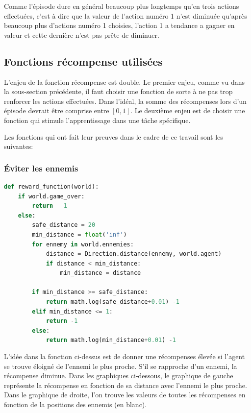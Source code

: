 \documentclass[11pt,a4paper]{report}
\begin{document}
  \par Comme l'épisode dure en général beaucoup plus longtemps qu'en trois actions effectuées, c'est à dire que la valeur de l'action numéro 1 n'est diminuée qu'après beaucoup plus d'actions numéro 1 choisies, l'action 1 a tendance a gagner en valeur et cette dernière n'est pas prête de diminuer. 
  
  \subsection{Fonctions récompense utilisées}
  
  \par L'enjeu de la fonction récompense est double. Le premier enjeu, comme vu dans la sous-section précédente, il faut choisir une fonction de sorte à ne pas trop renforcer les actions effectuées. Dans l'idéal, la somme des récompenses lors d'un épisode devrait être comprise entre $[0,1]$. Le deuxième enjeu est de choisir une fonction qui stimule l'apprentissage dans une tâche spécifique. 
  
  \par Les fonctions qui ont fait leur preuves dans le cadre de ce travail sont les suivantes: 
  
  \subsubsection{Éviter les ennemis}

  \begin{lstlisting}[language=python]
  def reward_function(world):
    if world.game_over:
        return - 1
    else:
        safe_distance = 20
        min_distance = float('inf')
        for ennemy in world.ennemies:
            distance = Direction.distance(ennemy, world.agent)
            if distance < min_distance:
                min_distance = distance

        if min_distance >= safe_distance:
            return math.log(safe_distance+0.01) -1
        elif min_distance <= 1:
            return -1
        else:
            return math.log(min_distance+0.01) -1  
   \end{lstlisting}   
      
   \par L'idée dans la fonction ci-dessus est de donner une récompenses élevée si l'agent se trouve éloigné de l'ennemi le plus proche. S'il se rapproche d'un ennemi, la  récompense diminue. Dans les graphiques ci-dessous, le graphique de gauche représente la récompense en fonction de sa distance avec l'ennemi le plus proche. Dans le graphique de droite, l'on trouve les valeurs de toutes les récompenses en fonction de la positions des ennemis (en blanc). 
   
\end{document}
